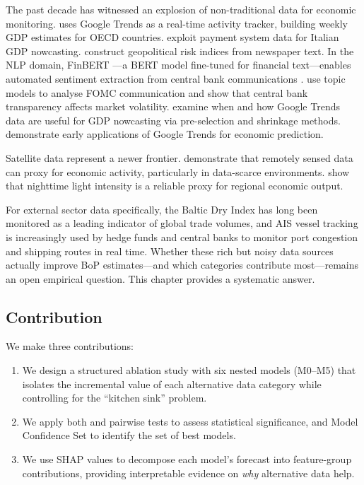 The past decade has witnessed an explosion of non-traditional data for economic monitoring.  \citet{woloszko2020tracking} uses Google Trends as a real-time activity tracker, building weekly GDP estimates for OECD countries.  \citet{aprigliano2019using} exploit payment system data for Italian GDP nowcasting.  \citet{caldara2022measuring} construct geopolitical risk indices from newspaper text.  In the NLP domain, FinBERT \citep{araci2019finbert}---a BERT model \citep{devlin2019bert} fine-tuned for financial text---enables automated sentiment extraction from central bank communications \citep{shapiro2022measuring}.  \citet{hansen2016shocking} use topic models to analyse FOMC communication and show that central bank transparency affects market volatility.  \citet{ferrara2022high} examine when and how Google Trends data are useful for GDP nowcasting via pre-selection and shrinkage methods.  \citet{choi2012predicting} demonstrate early applications of Google Trends for economic prediction.

Satellite data represent a newer frontier.  \citet{donaldson2016view} demonstrate that remotely sensed data can proxy for economic activity, particularly in data-scarce environments.  \citet{henderson2012measuring} show that nighttime light intensity is a reliable proxy for regional economic output.

For external sector data specifically, the Baltic Dry Index has long been monitored as a leading indicator of global trade volumes, and AIS vessel tracking is increasingly used by hedge funds and central banks to monitor port congestion and shipping routes in real time.  Whether these rich but noisy data sources actually improve BoP estimates---and which categories contribute most---remains an open empirical question.  This chapter provides a systematic answer.

\subsection{Contribution}

We make three contributions:
\begin{enumerate}
  \item We design a structured ablation study with six nested models (M0--M5) that isolates the incremental value of each alternative data category while controlling for the ``kitchen sink'' problem.
  \item We apply both \citet{diebold1995comparing} and \citet{giacomini2006tests} pairwise tests to assess statistical significance, and \citet{hansen2011model} Model Confidence Set to identify the set of best models.
  \item We use SHAP values \citep{lundberg2017unified} to decompose each model's forecast into feature-group contributions, providing interpretable evidence on \emph{why} alternative data help.
\end{enumerate}


